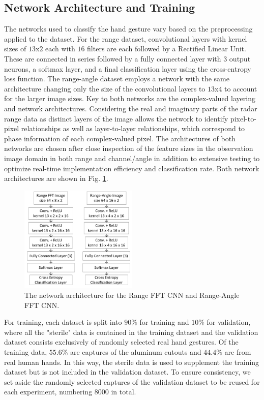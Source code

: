 \documentclass{ieeeaccess}
\begin{document}
\subsection{Network Architecture and Training}
\label{subsec:network_architecture}
The networks used to classify the hand gesture vary based on the preprocessing applied to the dataset. For the range dataset, convolutional layers with kernel sizes of $13$x$2$ each with $16$ filters are each followed by a Rectified Linear Unit. These are connected in series followed by a fully connected layer with $3$ output neurons, a softmax layer, and a final classification layer using the cross-entropy loss function. The range-angle dataset employs a network with the same architecture changing only the size of the convolutional layers to $13$x$4$ to account for the larger image sizes. Key to both networks are the complex-valued layering and network architectures. Considering the real and imaginary parts of the radar range data as distinct layers of the image allows the network to identify pixel-to-pixel relationships as well as layer-to-layer relationships, which correspond to phase information of each complex-valued pixel. The architectures of both networks are chosen after close inspection of the feature sizes in the observation image domain in both range and channel/angle in addition to extensive testing to optimize real-time implementation efficiency and classification rate. Both network architectures are shown in Fig. \ref{fig:cnn_architectures}. 

\begin{figure}[h]
    \centering
    \includegraphics[width=0.5\textwidth]{smith9.png}
    \caption{The network architecture for the Range FFT CNN and Range-Angle FFT CNN.}
    \label{fig:cnn_architectures}
\end{figure}

For training, each dataset is split into $90\%$ for training and $10\%$ for validation, where all the "sterile" data is contained in the training dataset and the validation dataset consists exclusively of randomly selected real hand gestures. Of the training data, $55.6\%$ are captures of the aluminum cutouts and $44.4\%$ are from real human hands. In this way, the sterile data is used to supplement the training dataset but is not included in the validation dataset. To ensure consistency, we set aside the randomly selected captures of the validation dataset to be reused for each experiment, numbering $8000$ in total.
\end{document}
